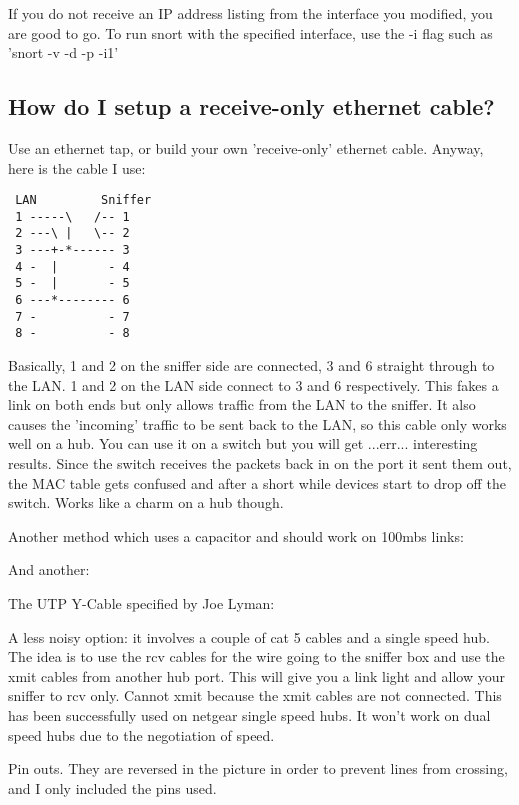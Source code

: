 \documentclass{article}
\begin{document}
If you do not receive an IP address listing from the interface you
modified, you are good to go.  To run snort with the specified interface,
use the -i flag such as 'snort -v -d -p -i1'
 
\subsection{How do I setup a receive-only ethernet cable?}

Use an ethernet tap, or build your own 'receive-only' ethernet cable.
Anyway, here is the cable I use: 

\begin{verbatim}
 LAN         Sniffer 
 1 -----\   /-- 1
 2 ---\ |   \-- 2
 3 ---+-*------ 3
 4 -  |       - 4
 5 -  |       - 5
 6 ---*-------- 6
 7 -          - 7
 8 -          - 8
\end{verbatim}

Basically, 1 and 2 on the sniffer side are connected, 3 and 6 
straight through to the LAN. 1 and 2 on the LAN side connect to 3 and 
6 respectively. This fakes a link on both ends but only allows 
traffic from the LAN to the sniffer. It also causes the 'incoming' 
traffic to be sent back to the LAN, so this cable only works well on 
a hub. You can use it on a switch but you will get ...err... 
interesting results. Since the switch receives the packets back in on 
the port it sent them out, the MAC table gets confused and after a 
short while devices start to drop off the switch. Works like a charm 
on a hub though. 

Another method which uses a capacitor and should work on 100mbs links:


And another:

    The UTP Y-Cable specified by Joe Lyman:

A less noisy option: it involves a couple of cat 5 cables and a single speed
hub. The idea is to use the rcv cables for the wire going to the sniffer box
and use the xmit cables from another hub port. This will give you a link light
and allow your sniffer to rcv only. Cannot xmit because the xmit cables are not
connected. This has been successfully used on netgear single speed hubs. It
won't work on dual speed hubs due to the negotiation of speed.

Pin outs. They are reversed in the picture in order to prevent lines from
crossing, and I only included the pins used.
\end{document}
